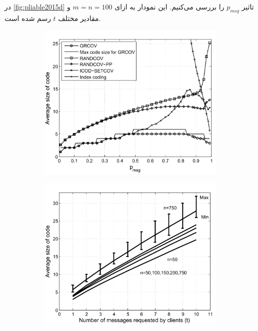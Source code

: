                   در
                    \autoref{fig:pliable2015d}
                    تاثیر
                    $p_{msg}$
                    را بررسی می‌کنیم. این نمودار به ازای
                    $m = n = 100$
                    و مقادیر مختلف
                    $t$
                    رسم شده است.
  \begin{figure}
  	\centering
	\begin{subfigure}[b]{0.45\textwidth}
			\centering
  	\includegraphics[width=\textwidth]{figs/ch3/pliable2015_a}
			\caption{}
			\label{fig:pliable2015a}
		\end{subfigure}
		\hfill
		  \begin{subfigure}[b]{0.45\textwidth}
			\centering
			\includegraphics[width=\textwidth]{figs/ch3/pliable2015_b}

\end{subfigure}
\end{figure}
